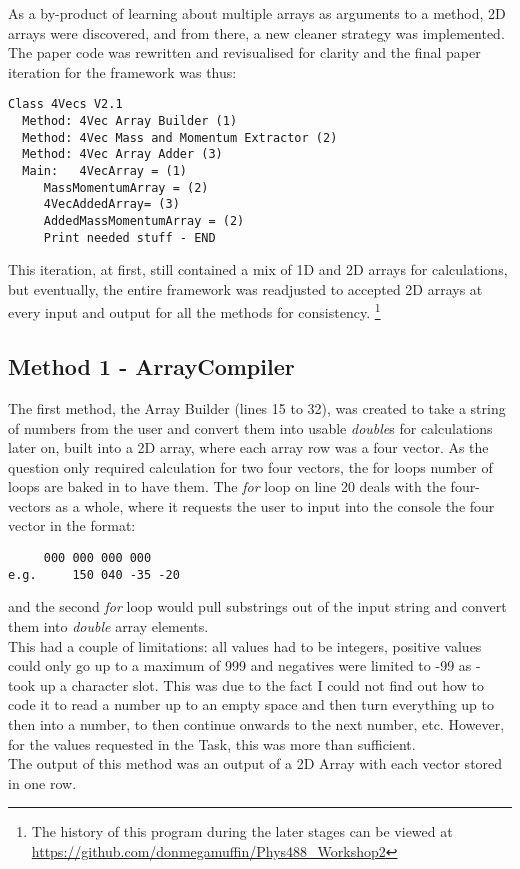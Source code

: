 \documentclass{article}
\begin{document}
\begin{multicols}{2}
		As a by-product of learning about multiple arrays as arguments to a method, 2D arrays were discovered, and from there, a new cleaner strategy was implemented. The paper code was rewritten and revisualised for clarity and the final paper iteration for the framework was thus:
		\begin{lstlisting}
Class 4Vecs V2.1
  Method: 4Vec Array Builder (1)
  Method: 4Vec Mass and Momentum Extractor (2)
  Method: 4Vec Array Adder (3)
  Main:   4VecArray = (1)
     MassMomentumArray = (2)
     4VecAddedArray= (3)
     AddedMassMomentumArray = (2)
     Print needed stuff - END
		\end{lstlisting}
		 This iteration, at first, still contained a mix of 1D and 2D arrays for calculations, but eventually, the entire framework was readjusted to accepted 2D arrays at every input and output for all the methods for consistency. \footnote{The history of this program during the later stages can be viewed at  \url{https://github.com/donmegamuffin/Phys488_Workshop2}}   %
			\subsection{Method 1 - ArrayCompiler}
			The first method, the Array Builder (lines 15 to 32), was created to take a string of numbers from the user and convert them into usable \textit{double}s for calculations later on, built into a 2D array, where each array row was a four vector. As the question only required calculation for two four vectors, the for loops number of loops are baked in to have them. The \textit{for} loop on line 20 deals with the four-vectors as a whole, where it requests the user to input into the console the four vector in the format:
			\begin{lstlisting}
	 000 000 000 000
e.g.     150 040 -35 -20
			\end{lstlisting}
			and the second \textit{for} loop would pull substrings out of the input string and convert them into \textit{double} array elements. \\ \indent This had a couple of limitations: all values had to be integers, positive values could only go up to a maximum of 999 and negatives were limited to -99 as - took up a character slot. This was due to the fact I could not find out how to code it to read a number up to an empty space and then turn everything up to then into a number, to then continue onwards to the next number, etc. However, for the values requested in the Task, this was more than sufficient. \\ \indent The output of this method was an output of a 2D Array with each vector stored in one row.

\end{multicols}
\end{document}
